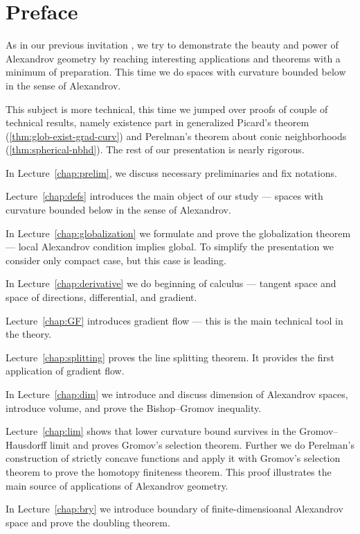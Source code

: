 \chapter*{Preface}

As in our previous invitation \cite{alexander-kapovitch-petrunin-2019},
we try to demonstrate the beauty and power of Alexandrov geometry by reaching interesting applications and theorems with a minimum of preparation.
This time we do spaces with curvature bounded below in the sense of Alexandrov.

This subject is more technical, this time we jumped over proofs of couple of technical results,
namely existence part in generalized Picard's theorem (\ref{thm:glob-exist-grad-curv})
and Perelman's theorem about conic neighborhoods (\ref{thm:spherical-nbhd}).
The rest of our presentation is nearly rigorous.

\medskip 

In Lecture~\ref{chap:prelim}, we discuss necessary preliminaries and fix notations.

Lecture~\ref{chap:defs} introduces the main object of our study --- spaces with curvature bounded below in the sense of Alexandrov.

In Lecture~\ref{chap:globalization} we formulate and prove the globalization theorem --- local Alexandrov condition implies global.
To simplify the presentation we consider only compact case, but this case is leading.

In Lecture~\ref{chap:derivative} we do beginning of calculus --- tangent space and space of directions, differential, and gradient.

Lecture~\ref{chap:GF} introduces gradient flow --- this is the main technical tool in the theory.

Lecture~\ref{chap:splitting} proves the line splitting theorem.
It provides the first application of gradient flow.

In Lecture~\ref{chap:dim} we introduce and discuss dimension of Alexandrov spaces,
introduce volume,
and prove the Bishop--Gromov inequality.

Lecture~\ref{chap:lim} shows that lower curvature bound survives in the Gromov--Hausdorff limit and proves Gromov's selection theorem.
Further we do Perelman's construction of strictly concave functions and apply it with Gromov's selection theorem to prove the homotopy finiteness theorem.
This proof illustrates the main source of applications of Alexandrov geometry.

In Lecture~\ref{chap:bry} we introduce boundary of finite-dimensioanal Alexandrov space and prove the doubling theorem.

